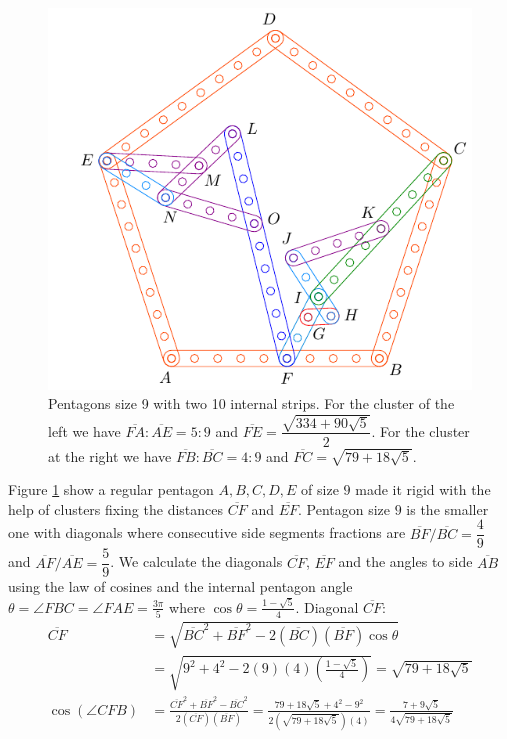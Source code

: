 \documentclass[11pt]{article}
\begin{document}
\begin{figure}[H]
 \centering
 \includegraphics[scale=0.9]{9/penta9b}
 \caption{Pentagons size 9 with two 10 internal strips. For the cluster of the left we have $\overline{FA}:\overline{AE} = 5:9$ and $\overline{FE} = \dfrac{\sqrt{334 + 90\sqrt5}}2$. For the cluster at the right we have $\overline{FB}:\overline{BC} = 4:9$ and $\overline{FC}=\sqrt{79 + 18\sqrt5}$.}
 \label{fig:penta9b}
\end{figure}

Figure \ref{fig:penta9b} show a regular pentagon $A,B,C,D,E$ of size $9$ made it rigid with the help of clusters fixing the distances $\overline{CF}$ and $\overline{EF}$. Pentagon size $9$ is the smaller one with diagonals where consecutive side segments fractions are $\overline{BF} / \overline{BC} =\dfrac{4}9$ and $\overline{AF} / \overline{AE} = \dfrac{5}9$. We calculate the diagonals $\overline{CF}$, $\overline{EF}$ and the angles to side $\overline{AB}$ using the law of cosines and the internal pentagon angle $\theta=\angle{FBC}=\angle{FAE}=\frac{3\pi}5$ where $\cos\theta = \frac{1-\sqrt5}4$. Diagonal $\overline{CF}$:
\begin{align}
\overline{CF} &= \sqrt{
 \overline{BC}^2 + \overline{BF}^2 - 2(\overline{BC})(\overline{BF})\cos\theta } \nonumber\\
 &= \sqrt{9^2 + 4^2 - 2(9)(4)\left(\frac{1-\sqrt5}4\right)} = \sqrt{79 + 18\sqrt5}\\
%
\cos(\angle{CFB}) &= 
 \frac{\overline{CF}^2 + \overline{BF}^2 - \overline{BC}^2}{2(\overline{CF})(\overline{BF})}
 = \frac{79 + 18\sqrt5 + 4^2 - 9^2}{2(\sqrt{79 + 18\sqrt5})(4)}
 = \frac{7 + 9\sqrt5}{4\sqrt{79 + 18\sqrt5}}
\end{align}
\end{document}

